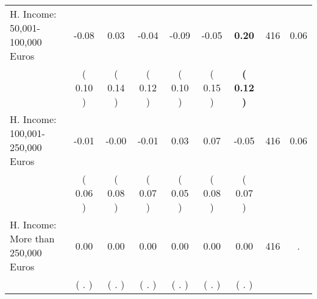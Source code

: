\begin{tabular}{lcccccccc}
H. Income: 50,001-100,000 Euros &     -0.08 &      0.03 &     -0.04 &     -0.09 &     -0.05 & \textbf{     0.20} & 416 &       0.06 \\ 
 & (     0.10 ) & (     0.14 ) & (     0.12 ) & (     0.10 ) & (     0.15 ) & \textbf{(     0.12 )} & \\
H. Income: 100,001-250,000 Euros &     -0.01 &     -0.00 &     -0.01 &      0.03 &      0.07 &     -0.05 & 416 &       0.06 \\ 
 & (     0.06 ) & (     0.08 ) & (     0.07 ) & (     0.05 ) & (     0.08 ) & (     0.07 ) & \\
H. Income: More than 250,000 Euros &      0.00 &      0.00 &      0.00 &      0.00 &      0.00 &      0.00 & 416 &          . \\ 
 & (        . ) & (        . ) & (        . ) & (        . ) & (        . ) & (        . ) & \\
\bottomrule
\end{tabular}
